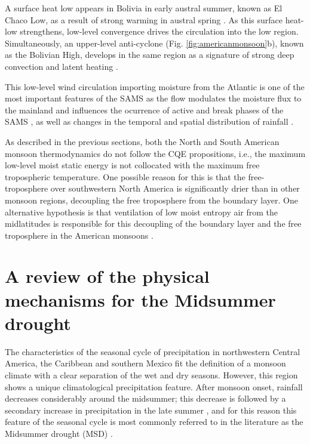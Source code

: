 A surface heat low appears in Bolivia in early austral summer, known as El Chaco Low, as a result of strong warming in austral spring \citep{marengo2012,sulca2018}.
 As this surface heat-low strengthens, low-level convergence drives the circulation into the low region.
 Simultaneously, an upper-level anti-cyclone (Fig. \ref{fig:americanmonsoon}b), known as the Bolivian High, develops in the same region as a signature of strong deep convection and latent heating \citep{marengo2001,vera2006}.

This low-level wind circulation importing moisture from the Atlantic is one of the most important features of the SAMS \citep{marengo2012,wang2017} as the flow modulates the moisture flux to the mainland and influences the ocurrence of active and break phases of the SAMS \citep{jones2002}, as well as changes in the temporal and spatial
distribution of rainfall \citep[e.g.][]{giannini2004,bombardi2011}.

As described in the previous sections, both the North and South American monsoon thermodynamics do not follow the CQE propositions, i.e., the maximum low-level moist static energy is not collocated with the maximum free tropospheric temperature. 
One possible reason for this is that the free-troposphere over southwestern North America is significantly drier than in other monsoon regions, decoupling the free troposphere from the boundary layer. One alternative hypothesis is that ventilation of low moist entropy air from the midlatitudes is responsible for this decoupling of the boundary layer and the free troposphere in the American monsoons \citep{boos2015review}.


\section{A review of the physical mechanisms for the Midsummer drought}\label{sq:litmsd}


The characteristics of the seasonal cycle of precipitation in northwestern Central America, the Caribbean and southern Mexico fit the definition of a monsoon climate \citep{wang2017} with a clear separation of the wet and dry seasons. 
However, this region shows a unique climatological precipitation feature. After monsoon onset, rainfall decreases considerably around the midsummer; this decrease is followed by a secondary increase in precipitation in the late summer \citep{mosino1966}, and for this reason this feature of the seasonal cycle is most commonly referred to in the literature as the Midsummer drought (MSD) \citep{magana1999}.   

